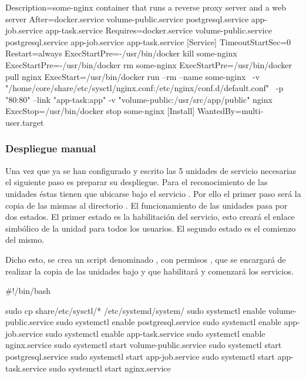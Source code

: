 \begin{codelisting}
\label{code:nginx.service}
\begin{code}
[Unit] 
  Description=some-nginx container that runs a reverse proxy server and a 
              web server
  After=docker.service volume-public.service postgresql.service app-job.service 
        app-task.service
  Requires=docker.service volume-public.service postgresql.service 
           app-job.service app-task.service
[Service] 
  TimeoutStartSec=0
  Restart=always 
  ExecStartPre=-/usr/bin/docker kill some-nginx 
  ExecStartPre=-/usr/bin/docker rm some-nginx
  ExecStartPre=/usr/bin/docker pull nginx 
  ExecStart=/usr/bin/docker run --rm --name some-nginx \
  -v "/home/core/share/etc/sysctl/nginx.conf:/etc/nginx/conf.d/default.conf" \
  -p "80:80" --link "app-task:app" -v "volume-public:/usr/src/app/public" nginx 
  ExecStop=/usr/bin/docker stop some-nginx
[Install] 
  WantedBy=multi-user.target
\end{code}
\end{codelisting}

\subsubsection{Despliegue manual}

Una vez que ya se han configurado y escrito las 5 unidades de servicio necesarias el siguiente paso es preparar su despliegue. Para el reconocimiento de las unidades éstas tienen que ubicarse bajo el servicio . Por ello el primer paso será la copia de las mismas al directorio . El funcionamiento de las unidades pasa por dos estados. El primer estado es la habilitación del servicio, esto creará el enlace simbólico de la unidad para todos los usuarios. El segundo estado es el comienzo del mismo.

Dicho esto, se crea un script denominado \kode{coreos-service-units-deploy.sh}, con permisos \kode{chmod +x}, que se encargará de realizar la copia de las unidades bajo \kode{systemd} y que habilitará y comenzará los servicios.

\begin{codelisting}
\label{code:coreos-service-units-deploy}
\begin{code}
#!/bin/bash

sudo cp share/etc/sysctl/* /etc/systemd/system/
sudo systemctl enable volume-public.service
sudo systemctl enable postgresql.service
sudo systemctl enable app-job.service
sudo systemctl enable app-task.service
sudo systemctl enable nginx.service
sudo systemctl start volume-public.service
sudo systemctl start postgresql.service
sudo systemctl start app-job.service
sudo systemctl start app-task.service
sudo systemctl start nginx.service
\end{code}
\end{codelisting}

